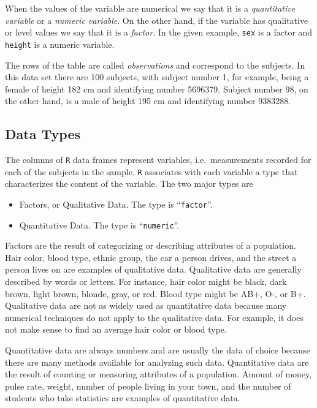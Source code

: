 \documentclass[]{krantz}
\theoremstyle{definition}
\theoremstyle{definition}
\theoremstyle{definition}
\theoremstyle{remark}
\begin{document}
When the values of the variable are numerical we say that it is a
\emph{quantitative variable} or a \emph{numeric variable}. On the other hand, if
the variable has qualitative or level values we say that it is a
\emph{factor}. In the given example, \texttt{sex} is a factor and \texttt{height} is a
numeric variable.

The rows of the table are called \emph{observations} and correspond to the
subjects. In this data set there are 100 subjects, with subject number
1, for example, being a female of height 182 cm and identifying number
5696379. Subject number 98, on the other hand, is a male of height 195
cm and identifying number 9383288.

\hypertarget{data-types}{%
\subsection{Data Types}\label{data-types}}

The columns of \texttt{R} data frames represent variables, i.e.~measurements
recorded for each of the subjects in the sample. \texttt{R} associates with
each variable a type that characterizes the content of the variable. The
two major types are

\begin{itemize}
\item
  Factors, or Qualitative Data. The type is ``\texttt{factor}''.
\item
  Quantitative Data. The type is ``\texttt{numeric}''.
\end{itemize}

Factors are the result of categorizing or describing attributes of a
population. Hair color, blood type, ethnic group, the car a person
drives, and the street a person lives on are examples of qualitative
data. Qualitative data are generally described by words or letters. For
instance, hair color might be black, dark brown, light brown, blonde,
gray, or red. Blood type might be AB+, O-, or B+. Qualitative data are
not as widely used as quantitative data because many numerical
techniques do not apply to the qualitative data. For example, it does
not make sense to find an average hair color or blood type.

Quantitative data are always numbers and are usually the data of choice
because there are many methods available for analyzing such data.
Quantitative data are the result of counting or measuring attributes of
a population. Amount of money, pulse rate, weight, number of people
living in your town, and the number of students who take statistics are
examples of quantitative data.
\end{document}
